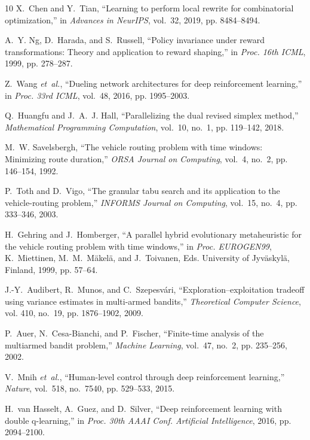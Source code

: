 \documentclass{ieeeaccess}
\begin{document}
{\begin{thebibliography}{10}
X.~Chen and Y.~Tian, ``Learning to perform local rewrite for combinatorial optimization,'' in \emph{Advances in NeurIPS}, vol.~32, 2019, pp. 8484--8494.

A.~Y. Ng, D.~Harada, and S.~Russell, ``Policy invariance under reward transformations: Theory and application to reward shaping,'' in \emph{Proc. 16th ICML}, 1999, pp. 278--287.

Z.~Wang \emph{et~al.}, ``Dueling network architectures for deep reinforcement learning,'' in \emph{Proc. 33rd ICML}, vol.~48, 2016, pp. 1995--2003.

Q.~Huangfu and J.~A.~J. Hall, ``Parallelizing the dual revised simplex method,'' \emph{Mathematical Programming Computation}, vol.~10, no.~1, pp. 119--142, 2018.

M.~W. Savelsbergh, ``The vehicle routing problem with time windows: Minimizing route duration,'' \emph{ORSA Journal on Computing}, vol.~4, no.~2, pp. 146--154, 1992.

P.~Toth and D.~Vigo, ``The granular tabu search and its application to the vehicle-routing problem,'' \emph{INFORMS Journal on Computing}, vol.~15, no.~4, pp. 333--346, 2003.

H.~Gehring and J.~Homberger, ``A parallel hybrid evolutionary metaheuristic for the vehicle routing problem with time windows,'' in \emph{Proc. EUROGEN99}, K.~Miettinen, M.~M.~M{\"a}kel{\"a}, and J.~Toivanen, Eds. University of Jyv{\"a}skyl{\"a}, Finland, 1999, pp. 57--64.

J.-Y.~Audibert, R.~Munos, and C.~Szepesv{\'a}ri, ``Exploration--exploitation tradeoff using variance estimates in multi-armed bandits,'' \emph{Theoretical Computer Science}, vol. 410, no.~19, pp. 1876--1902, 2009.

P.~Auer, N.~Cesa-Bianchi, and P.~Fischer, ``Finite-time analysis of the multiarmed bandit problem,'' \emph{Machine Learning}, vol.~47, no.~2, pp. 235--256, 2002.

V.~Mnih \emph{et~al.}, ``Human-level control through deep reinforcement learning,'' \emph{Nature}, vol.~518, no.~7540, pp. 529--533, 2015.

H.~van Hasselt, A.~Guez, and D.~Silver, ``Deep reinforcement learning with double q-learning,'' in \emph{Proc. 30th AAAI Conf. Artificial Intelligence}, 2016, pp. 2094--2100.


\end{thebibliography}}
\end{document}
